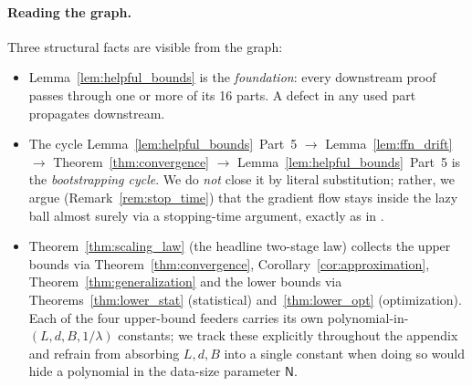 \documentclass[11pt]{article}
\let\citet\citep
\theoremstyle{plain}
\begin{document}
\paragraph{Reading the graph.} Three structural facts are visible from the graph:
\begin{itemize}
    \item[(a)] Lemma~\ref{lem:helpful_bounds} is the {\it foundation}: every downstream proof passes through one or more of its 16 parts. A defect in any used part propagates downstream.
    \item[(b)] The cycle Lemma~\ref{lem:helpful_bounds}~Part~5 $\to$ Lemma~\ref{lem:ffn_drift} $\to$ Theorem~\ref{thm:convergence} $\to$ Lemma~\ref{lem:helpful_bounds}~Part~5 is the {\it bootstrapping cycle}. We do {\it not} close it by literal substitution; rather, we argue (Remark~\ref{rem:stop_time}) that the gradient flow stays inside the lazy ball almost surely via a stopping-time argument, exactly as in \citet[Section~3]{dzps19}.
    \item[(c)] Theorem~\ref{thm:scaling_law} (the headline two-stage law) collects the upper bounds via Theorem~\ref{thm:convergence}, Corollary~\ref{cor:approximation}, Theorem~\ref{thm:generalization} and the lower bounds via Theorems~\ref{thm:lower_stat} (statistical) and~\ref{thm:lower_opt} (optimization). Each of the four upper-bound feeders carries its own polynomial-in-$(L,d,B,1/\lambda)$ constants; we track these explicitly throughout the appendix and refrain from absorbing $L,d,B$ into a single constant when doing so would hide a polynomial in the data-size parameter $\mathsf{N}$.
\end{itemize}
\end{document}
